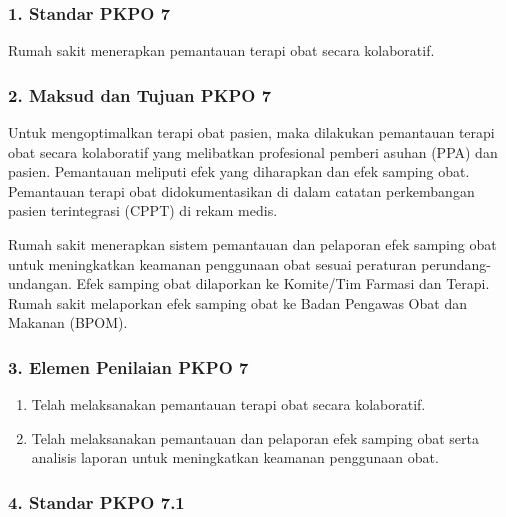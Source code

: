 \documentclass[
]{book}
\providecommand{\tightlist}{%
  \setlength{\itemsep}{0pt}\setlength{\parskip}{0pt}}
\begin{document}
\hypertarget{standar-pkpo-7}{%
\subsubsection*{1. Standar PKPO 7}\label{standar-pkpo-7}}

Rumah sakit menerapkan pemantauan terapi obat secara kolaboratif.

\hypertarget{maksud-dan-tujuan-pkpo-7}{%
\subsubsection*{2. Maksud dan Tujuan PKPO 7}\label{maksud-dan-tujuan-pkpo-7}}

Untuk mengoptimalkan terapi obat pasien, maka dilakukan pemantauan terapi obat secara kolaboratif yang melibatkan profesional pemberi asuhan (PPA) dan pasien. Pemantauan meliputi efek yang diharapkan dan efek samping obat. Pemantauan terapi obat didokumentasikan di dalam catatan perkembangan pasien terintegrasi (CPPT) di rekam medis.

Rumah sakit menerapkan sistem pemantauan dan pelaporan efek samping obat untuk meningkatkan keamanan penggunaan obat sesuai peraturan perundang- undangan. Efek samping obat dilaporkan ke Komite/Tim Farmasi dan Terapi. Rumah sakit melaporkan efek samping obat ke Badan Pengawas Obat dan Makanan (BPOM).

\hypertarget{elemen-penilaian-pkpo-7}{%
\subsubsection*{3. Elemen Penilaian PKPO 7}\label{elemen-penilaian-pkpo-7}}

\begin{enumerate}
\def\labelenumi{\alph{enumi}.}
\tightlist
\item
  Telah melaksanakan pemantauan terapi obat secara kolaboratif.
\item
  Telah melaksanakan pemantauan dan pelaporan efek samping obat serta analisis laporan untuk meningkatkan keamanan penggunaan obat.
\end{enumerate}

\hypertarget{standar-pkpo-7.1}{%
\subsubsection*{4. Standar PKPO 7.1}\label{standar-pkpo-7.1}}
\end{document}
